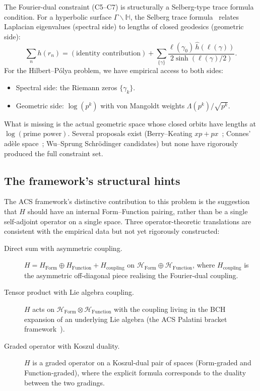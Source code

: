 \documentclass[11pt,a4paper]{article}
\theoremstyle{plain}
\theoremstyle{definition}
\theoremstyle{remark}
\begin{document}
The Fourier-dual constraint (C5--C7) is structurally a Selberg-type
trace formula condition. For a hyperbolic surface $\Gamma \backslash \mathbb{H}$,
the Selberg trace formula~\cite{Selberg1956} relates Laplacian
eigenvalues (spectral side) to lengths of closed geodesics (geometric side):
\begin{equation}
  \sum_{n} h(r_n) = (\text{identity contribution}) + \sum_{\{\gamma\}}
  \frac{\ell(\gamma_0) \, \hat{h}(\ell(\gamma))}{2 \sinh(\ell(\gamma)/2)}.
\end{equation}
For the Hilbert--Pólya problem, we have empirical access to both sides:
\begin{itemize}
\item Spectral side: the Riemann zeros $\{\gamma_k\}$.
\item Geometric side: $\log(p^k)$ with von Mangoldt weights $\Lambda(p^k)/\sqrt{p^k}$.
\end{itemize}
What is missing is the actual geometric space whose closed orbits
have lengths at $\log(\text{prime power})$. Several proposals exist
(Berry--Keating $xp+px$~\cite{BerryKeating1999}; Connes' adèle space~\cite{Connes1999};
Wu--Sprung Schrödinger candidates) but none have rigorously produced
the full constraint set.

\subsection{The framework's structural hints}
\label{sec:hp-acs-hints}

The ACS framework's distinctive contribution to this problem is the
suggestion that $H$ should have an internal Form--Function pairing,
rather than be a single self-adjoint operator on a single space.
Three operator-theoretic translations are consistent with the empirical
data but not yet rigorously constructed:

\begin{description}
\item[Direct sum with asymmetric coupling.]
$H = H_{\text{Form}} \oplus H_{\text{Function}} + H_{\text{coupling}}$
on $\mathcal{H}_{\text{Form}} \oplus \mathcal{H}_{\text{Function}}$,
where $H_{\text{coupling}}$ is the asymmetric off-diagonal piece
realising the Fourier-dual coupling.

\item[Tensor product with Lie algebra coupling.]
$H$ acts on $\mathcal{H}_{\text{Form}} \otimes \mathcal{H}_{\text{Function}}$
with the coupling living in the BCH expansion of an underlying Lie algebra
(the ACS Palatini bracket framework~\cite{Wallace2026a}).

\item[Graded operator with Koszul duality.]
$H$ is a graded operator on a Koszul-dual pair of spaces (Form-graded
and Function-graded), where the explicit formula corresponds to the
duality between the two gradings.
\end{description}
\end{document}
